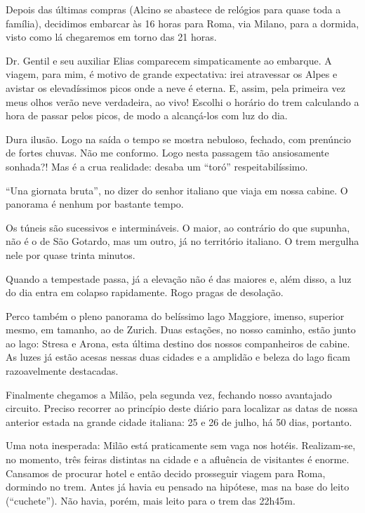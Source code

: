 Depois das últimas compras (Alcino se abastece de relógios para quase toda a família), decidimos embarcar às 16 horas para Roma, via Milano, para a dormida, visto como lá chegaremos em torno das 21 horas.

Dr. Gentil e seu auxiliar Elias comparecem simpaticamente ao embarque. A viagem, para mim, é motivo de grande expectativa: irei atravessar os Alpes e avistar os elevadíssimos picos onde a neve é eterna. E, assim, pela primeira vez meus olhos verão neve verdadeira, ao vivo! Escolhi o horário do trem calculando a hora de passar pelos picos, de modo a alcançá-los com luz do dia.

Dura ilusão. Logo na saída o tempo se mostra nebuloso, fechado, com prenúncio de fortes chuvas. Não me conformo. Logo nesta passagem tão ansiosamente sonhada?! Mas é a crua realidade: desaba um ``toró'' respeitabilíssimo.

``Una giornata bruta'', no dizer do senhor italiano que viaja em nossa cabine. O panorama é nenhum por bastante tempo.

Os túneis são sucessivos e intermináveis. O maior, ao contrário do que supunha, não é o de São Gotardo, mas um outro, já no território italiano. O trem mergulha nele por quase trinta minutos.

Quando a tempestade passa, já a elevação não é das maiores e, além disso, a luz do dia entra em colapso rapidamente. Rogo pragas de desolação.

Perco também o pleno panorama do belíssimo lago Maggiore, imenso, superior mesmo, em tamanho, ao de Zurich. Duas estações, no nosso caminho, estão junto ao lago: Stresa e Arona, esta última destino dos nossos companheiros de cabine. As luzes já estão acesas nessas duas cidades e a amplidão e beleza do lago ficam razoavelmente destacadas.

Finalmente chegamos a Milão, pela segunda vez, fechando nosso avantajado circuito. Preciso recorrer ao princípio deste diário para localizar as datas de nossa anterior estada na grande cidade italiana: 25 e 26 de julho, há 50 dias, portanto.

Uma nota inesperada: Milão está praticamente sem vaga nos hotéis. Realizam-se, no momento, três feiras distintas na cidade e a afluência de visitantes é enorme. Cansamos de procurar hotel e então decido prosseguir viagem para Roma, dormindo no trem. Antes já havia eu pensado na hipótese, mas na base do leito (``cuchete''). Não havia, porém, mais leito para o trem das 22h45m.

